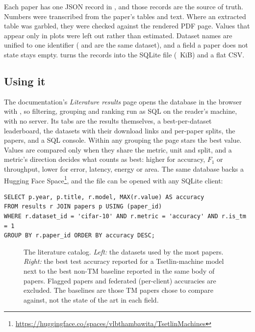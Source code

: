 Each paper has one JSON record in , and those records are
the source of truth. Numbers were transcribed from the paper's tables and text. Where an
extracted table was garbled, they were checked against the rendered PDF page. Values that
appear only in plots were left out rather than estimated. Dataset names are unified to one
identifier ( and  are the same dataset), and a field a paper
does not state stays empty.  turns the records into the SQLite file
 (\litDbKiB~KiB) and a flat CSV.

\subsection{Using it}

The documentation's \emph{Literature results} page opens the database in the browser with
, so filtering, grouping and ranking run as SQL on the reader's machine, with no
server. Its tabs are the results themselves, a best-per-dataset leaderboard, the datasets with
their download links and per-paper splits, the papers, and a SQL console. Within any grouping
the page stars the best value. Values are compared only when they share the metric, unit and
split, and a metric's direction decides what counts as best: higher for accuracy, $F_1$ or
throughput, lower for error, latency, energy or area. The same database backs a Hugging Face
Space\footnote{\url{https://huggingface.co/spaces/vlbthambawita/TsetlinMachines}}, and the
file can be opened with any SQLite client:

\begin{lstlisting}[style=ttshell,basicstyle=\ttfamily\scriptsize\color{ttink}]
SELECT p.year, p.title, r.model, MAX(r.value) AS accuracy
FROM results r JOIN papers p USING (paper_id)
WHERE r.dataset_id = 'cifar-10' AND r.metric = 'accuracy' AND r.is_tm = 1
GROUP BY r.paper_id ORDER BY accuracy DESC;
\end{lstlisting}

\begin{figure}[htbp]
\centering
\resizebox{\linewidth}{!}{}
\caption{The literature catalog. \emph{Left:} the datasets used by the most papers.
  \emph{Right:} the best test accuracy reported for a Tsetlin-machine model next to the best
  non-TM baseline reported in the same body of papers. Flagged papers and federated
  (per-client) accuracies are excluded. The baselines are those TM papers chose to compare
  against, not the state of the art in each field.}
\label{fig:literature}
\end{figure}

